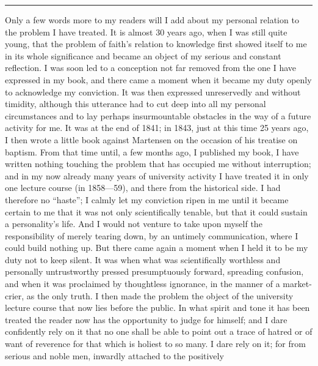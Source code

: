 \documentclass[12pt,a4paper]{book}
\begin{document}
\begin{center}\rule{2cm}{0.4pt}\end{center}

Only a few words more to my readers will I add about my personal relation to the
problem I have treated. It is almost 30 years ago, when I was still quite young,
that the problem of faith's relation to knowledge first showed itself to me in
its whole significance and became an object of my serious and constant
reflection. I was soon led to a conception not far removed from the one I have
expressed in my book, and there came a moment when it became my duty openly to
acknowledge my conviction. It was then expressed unreservedly and without
timidity, although this utterance had to cut deep into all my personal
circumstances and to lay perhaps insurmountable obstacles in the way of a future
activity for me. It was at the end of 1841; in 1843, just at this time 25 years
ago, I then wrote a little book against Martensen on the occasion of his treatise
on baptism. From that time until, a few months ago, I published my book, I have
written nothing touching the problem that has occupied me without interruption;
and in my now already many years of university activity I have treated it in only
one lecture course (in 1858---59), and there from the historical side. I
had therefore no ``haste''; I calmly let my conviction ripen in
me until it became certain to me that it was not only scientifically tenable, but
that it could sustain a personality's life. And I would not venture to take upon
myself the responsibility of merely tearing down, by an untimely communication,
where I could build nothing up. But there came again a moment when I held it to
be my duty not to keep silent. It was when what was scientifically worthless and
personally untrustworthy pressed presumptuously forward, spreading confusion, and
when it was proclaimed by thoughtless ignorance, in the manner of a
market-crier, as the only truth. I then made the problem the object of the
university lecture course that now lies before the public. In what spirit and
tone it has been treated the reader now has the opportunity to judge for himself;
and I dare confidently rely on it that no one shall be able to point out a trace
of hatred or of want of reverence for that which is holiest to so many. I dare
rely on it; for from serious and noble men, inwardly attached to the positively
\end{document}
